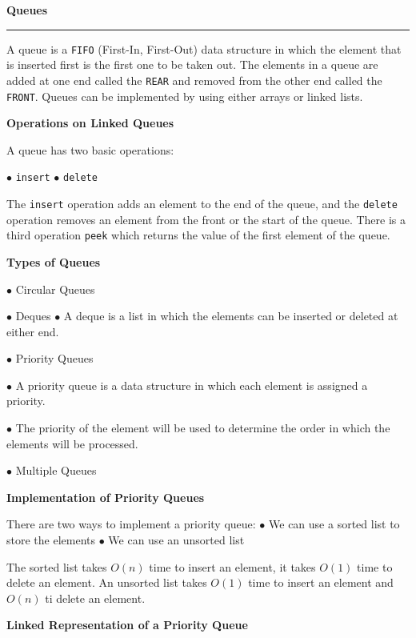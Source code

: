 {\bf Queues}
\vskip 1mm
\hrule

\vskip 3mm
A queue is a {\tt FIFO} (First-In, First-Out) data structure in which the element that is inserted first is the first one to be taken out. The elements in a queue are added at one end called the {\tt REAR} and removed from the other end called the {\tt FRONT}. Queues can be implemented by using either arrays or linked lists.

\filbreak
\vskip 1cm
{\bf Operations on Linked Queues}

\vskip 1mm
A queue has two basic operations:
\vskip 1mm

\qquad$\bullet$ {\tt insert}
\vskip 1mm
\qquad$\bullet$ {\tt delete}

\vskip 3mm
The {\tt insert} operation adds an element to the end of the queue, and the {\tt delete} operation removes an element from the front or the start of the queue. There is a third operation {\tt peek} which returns the value of the first element of the queue.

\filbreak
\vskip 1cm
{\bf Types of Queues}

\vskip 3mm
\qquad$\bullet$ Circular Queues

\vskip 3mm
\qquad$\bullet$ Deques
\vskip 1mm
\qquad\qquad$\bullet$ A deque is a list in which the elements can be inserted or deleted at either end.

\vskip 3mm
\qquad$\bullet$ Priority Queues

\vskip 1mm
\qquad\qquad$\bullet$ A priority queue is a data structure in which each element is assigned a priority.

\vskip 2mm
\qquad\qquad$\bullet$ The priority of the element will be used to determine the order in which the elements will be
\vskip 1mm
\qquad\qquad processed.

\vskip 3mm
\qquad$\bullet$ Multiple Queues

\filbreak
\vskip 1cm
{\bf Implementation of Priority Queues}

\vskip 3mm
There are two ways to implement a priority queue:
\vskip 1mm
\qquad$\bullet$ We can use a sorted list to store the elements
\vskip 1mm
\qquad$\bullet$ We can use an unsorted list

\vskip 3mm
The sorted list takes $O(n)$ time to insert an element, it takes $O(1)$ time to delete an element. An unsorted list takes $O(1)$ time to insert an element and $O(n)$ ti delete an element.

\filbreak
\vskip 1cm
{\bf Linked Representation of a Priority Queue}


